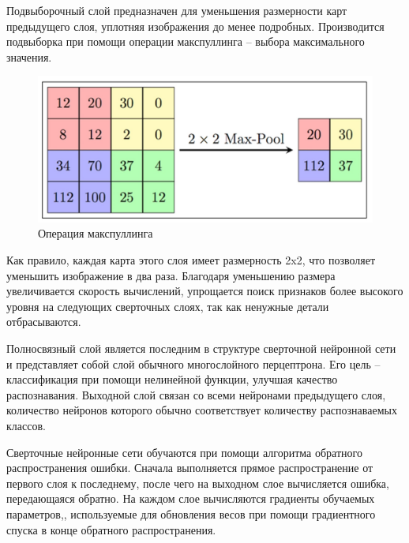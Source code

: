 Подвыборочный слой предназначен для уменьшения размерности карт предыдущего слоя, уплотняя изображения до менее подробных. Производится подвыборка при помощи операции макспуллинга -- выбора максимального значения.
\begin{figure}[H]
	\centering
	\includegraphics[width=0.7\linewidth]{images/maxpooling}
	\caption{Операция макспуллинга}
	\label{fig:maxpooling}
\end{figure}
Как правило, каждая карта этого слоя имеет размерность 2x2, что позволяет уменьшить изображение в два раза. Благодаря уменьшению размера увеличивается скорость вычислений, упрощается поиск признаков более высокого уровня на следующих сверточных слоях, так как ненужные детали отбрасываются.

Полносвязный слой является последним в структуре сверточной нейронной сети и представляет собой слой обычного многослойного перцептрона. Его цель -- классификация при помощи нелинейной функции, улучшая качество распознавания. Выходной слой связан со всеми нейронами предыдущего слоя, количество нейронов которого обычно соответствует количеству распознаваемых классов. 

Сверточные нейронные сети обучаются при помощи алгоритма обратного распространения ошибки. Сначала выполняется прямое распространение от первого слоя к последнему, после чего на выходном слое вычисляется ошибка, передающаяся обратно. На каждом слое вычисляются градиенты обучаемых параметров,, используемые для обновления весов при помощи градиентного спуска в конце обратного распространения.